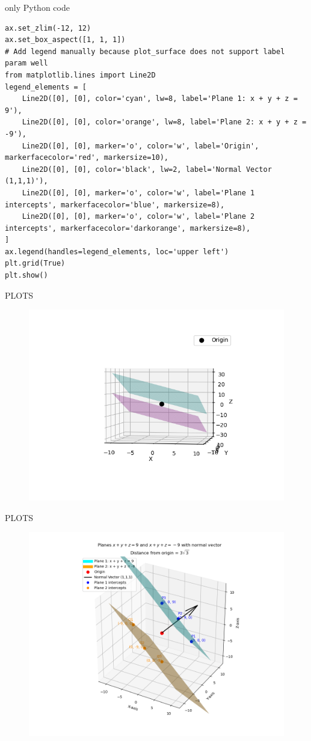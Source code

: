 \documentclass{beamer}
\begin{document}
\begin{frame}[fragile]{only Python code}
\begin{lstlisting}
ax.set_zlim(-12, 12)
ax.set_box_aspect([1, 1, 1])
# Add legend manually because plot_surface does not support label param well
from matplotlib.lines import Line2D
legend_elements = [
    Line2D([0], [0], color='cyan', lw=8, label='Plane 1: x + y + z = 9'),
    Line2D([0], [0], color='orange', lw=8, label='Plane 2: x + y + z = -9'),
    Line2D([0], [0], marker='o', color='w', label='Origin', markerfacecolor='red', markersize=10),
    Line2D([0], [0], color='black', lw=2, label='Normal Vector (1,1,1)'),
    Line2D([0], [0], marker='o', color='w', label='Plane 1 intercepts', markerfacecolor='blue', markersize=8),
    Line2D([0], [0], marker='o', color='w', label='Plane 2 intercepts', markerfacecolor='darkorange', markersize=8),
]
ax.legend(handles=legend_elements, loc='upper left')
plt.grid(True)
plt.show()
 \end{lstlisting}
\end{frame}
\begin{frame}[fragile]{PLOTS}
\begin{figure}
    \centering
    \includegraphics[width=0.9\columnwidth]{figs/fig71.png}
    \caption{}
    \label{fig:placeholder}
\end{figure}
\end{frame}
\begin{frame}[fragile]{PLOTS}
\begin{figure}
    \centering
    \includegraphics[width=0.9\columnwidth]{figs/fig72.png}
    \caption{}
    \label{fig:placeholder}
\end{figure}
\end{frame}
\end{document}
